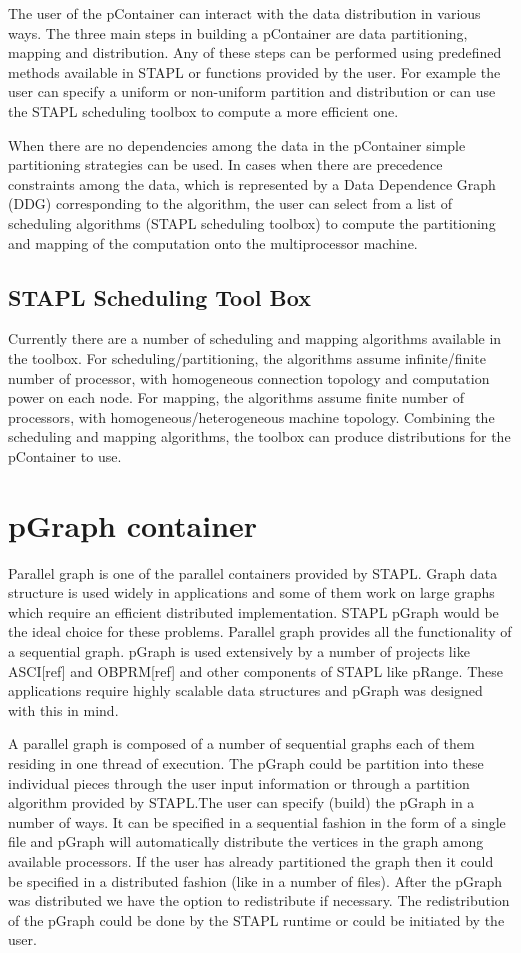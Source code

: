 \documentclass[12pt,epsfig]{article}
\begin{document}
The user of the pContainer can interact with the data distribution in
various ways. The three main steps in building a pContainer are data
partitioning, mapping and distribution. Any of these steps can be
performed using predefined methods available in STAPL or functions
provided by the user. For example the user can specify a uniform or
non-uniform partition and distribution or can use the STAPL scheduling
toolbox to compute a more efficient one.

When there are no dependencies among the data in the pContainer
simple partitioning strategies can be used. In cases when there are
precedence constraints among the data, which is represented by a Data
Dependence Graph (DDG) corresponding to the algorithm, the user can
select from a list of scheduling algorithms (STAPL scheduling toolbox)
to compute the partitioning and mapping of the computation onto the
multiprocessor machine.

\subsection{STAPL Scheduling Tool Box}
Currently there are a number of scheduling and mapping algorithms
available in the toolbox. For scheduling/partitioning, the algorithms
assume infinite/finite number of processor, with homogeneous
connection topology and computation power on each node. For mapping,
the algorithms assume finite number of processors, with
homogeneous/heterogeneous machine topology. Combining the scheduling
and mapping algorithms, the toolbox can produce distributions for the
pContainer to use.


\section{pGraph container}

Parallel graph is one of the parallel containers provided by
STAPL. Graph data structure is used widely in applications and some of
them work on large graphs which require an efficient distributed
implementation.  STAPL pGraph would be the ideal choice for these
problems. Parallel graph provides all the functionality of a
sequential graph. pGraph is used extensively by a number of projects
like ASCI[ref] and OBPRM[ref] and other components of STAPL like
pRange. These applications require highly scalable data structures and
pGraph was designed with this in mind.

A parallel graph is composed of a number of sequential graphs each of
them residing in one thread of execution. The pGraph could be
partition into these individual pieces through the user input
information or through a partition algorithm provided by STAPL.The
user can specify (build) the pGraph in a number of ways. It can be
specified in a sequential fashion in the form of a single file and
pGraph will automatically distribute the vertices in the graph
among available processors. If the user has already partitioned the
graph then it could be specified in a distributed fashion (like in a
number of files).  After the pGraph was distributed we have the option
to redistribute if necessary. The redistribution of the pGraph could be
done by the STAPL runtime or could be initiated by the user.
\end{document}
